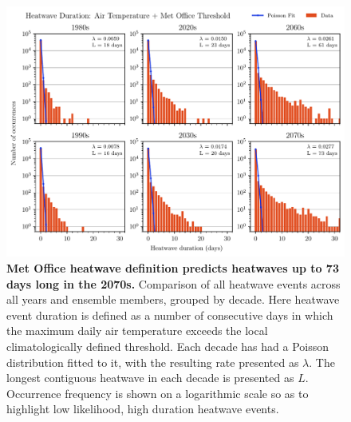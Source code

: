 \documentclass[10pt,letterpaper]{article}
\begin{document}
\begin{figure}
\begin{adjustwidth}{-2.25in}{0in}
    \begin{center}
        \includegraphics[width=\linewidth]{./tas_poisson.pdf}
    \end{center}
    \caption{
    {\bf Met Office heatwave definition predicts heatwaves up to 73 days long in the 2070s.}
    Comparison of all heatwave events across all years and ensemble members, grouped by decade.
    Here heatwave event duration is defined as a number of consecutive days in which the maximum daily air temperature exceeds the local climatologically defined threshold.
    Each decade has had a Poisson distribution fitted to it, with the resulting rate presented as $\lambda$.
    The longest contiguous heatwave in each decade is presented as $L$.
    Occurrence frequency is shown on a logarithmic scale so as to highlight low likelihood, high duration heatwave events.
    }
    \label{tas-poisson}
\end{adjustwidth}
\end{figure}
\end{document}
